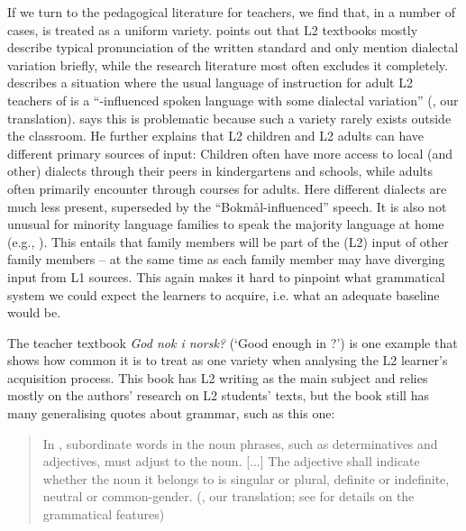 \documentclass[output=paper,colorlinks,citecolor=brown,modfonts,nonflat]{../langscibook}
\begin{document}
If we turn to the pedagogical literature for teachers, we find that, in a number of cases,  is treated as a uniform variety. \citet{Heide2017} points out that L2 textbooks mostly describe typical pronunciation of the written standard  and only mention dialectal variation briefly, while the research literature most often excludes it completely. \citet{Husby2009} describes a situation where the usual language of instruction for adult L2 teachers of  is a “-influenced spoken language with some dialectal variation” (\citealt{Husby2009}, our translation). \citeauthor{Husby2009} says this is problematic because such a variety rarely exists outside the classroom. He further explains that L2 children and L2 adults can have different primary sources of input: Children often have more access to local (and other) dialects through their peers in kindergartens and schools, while adults often primarily encounter  through  courses for adults. Here different dialects are much less present, superseded by the ``Bok\-mål-influenced'' speech. It is also not unusual for minority language families to speak the majority language at home (e.g., \citealt{BerggreenLatomaa1994,Kulbrandstad1997,Mancilla-MartinezKieffer2010,KarlsenLykkenborg2012,Fulland2016}). This entails that family members will be part of the (L2) input of other family members – at the same time as each family member may have diverging input from L1  sources. This again makes it hard to pinpoint what grammatical system we could expect the learners to acquire, i.e. what an adequate baseline would be.

The teacher textbook \textit{God nok i norsk?} (‘Good enough in ?’) \citep{BerggreenEtAl2012} is one example that shows how common it is to treat  as one variety when analysing the L2 learner’s acquisition process. This book has L2 writing as the main subject and relies mostly on the authors’ research on L2 students’ texts, but the book still has many generalising quotes about  grammar, such as this one:

\begin{quote}
  In , subordinate words in the noun phrases, such as determinatives and
adjectives, must adjust to the noun. [...] The adjective shall indicate whether the noun 
it belongs to is singular or plural, definite or indefinite, neutral or common-gender.
(\citealt[80]{BerggreenEtAl2012}, our translation; see  for details on the grammatical features)
\end{quote}
\end{document}
